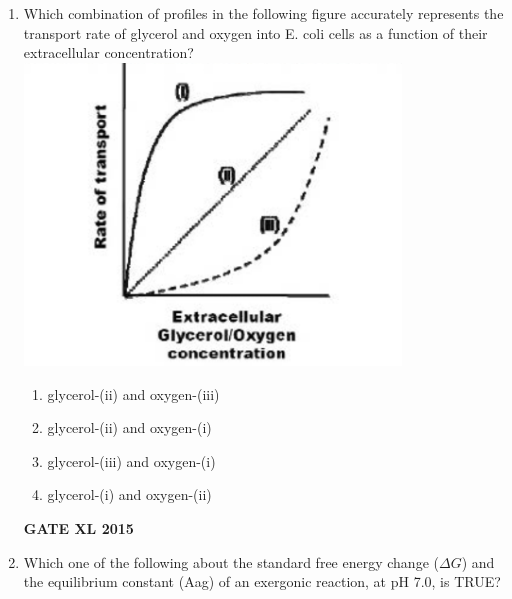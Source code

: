 \documentclass[journal,12pt,onecolumn]{IEEEtran}
\begin{document}
\begin{enumerate}
(P) Specialized transducing phages can transport only certain genes between bacteria

(Q) Specialized transducing phages can transport any gene between bacteria

(R) Phage P22 is a specialized transducing phage

(S) Phage lambda (2) is a specialized transducing phage
    \begin{enumerate}
            \item P and S only
	    \item Q and R only
	    \item Q and S only
            \item P and R only
    \end{enumerate}
\begin{flushright}\textbf{GATE XL 2015}\end{flushright}
\item Which combination of profiles in the following figure accurately represents the transport rate of glycerol and oxygen into E. coli cells as a function of their extracellular concentration?\\
	\includegraphics[width=10cm]{77}
    \begin{enumerate}
	    \item glycerol-(ii) and oxygen-(iii)
	    \item glycerol-(ii) and oxygen-(i)
	    \item glycerol-(iii) and oxygen-(i)
	    \item glycerol-(i) and oxygen-(ii)
    \end{enumerate}
\begin{flushright}\textbf{GATE XL 2015}\end{flushright}
\item Which one of the following about the standard free energy change ($\Delta G$) and the equilibrium constant (Aag) of an exergonic reaction, at pH 7.0, is TRUE?

\end{enumerate}
\end{document}
